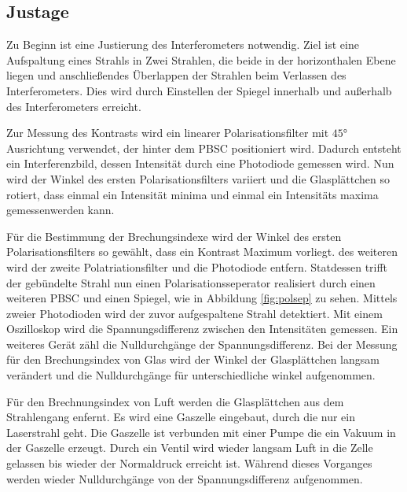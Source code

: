 \subsection{Justage}
Zu Beginn ist eine Justierung des Interferometers notwendig.
Ziel ist eine Aufspaltung eines Strahls in Zwei Strahlen, die beide in
der horizonthalen Ebene liegen und anschließendes Überlappen der Strahlen
beim Verlassen des Interferometers. Dies wird durch Einstellen der
Spiegel innerhalb und außerhalb des Interferometers erreicht.


Zur Messung des Kontrasts wird ein linearer Polarisationsfilter mit $45\si{\degree}$
Ausrichtung verwendet, der hinter dem PBSC positioniert wird.
Dadurch entsteht ein Interferenzbild, dessen Intensität durch eine Photodiode gemessen wird.
Nun wird der Winkel des ersten Polarisationsfilters variiert
und die Glasplättchen so rotiert, dass einmal ein Intensität minima und einmal
ein Intensitäts maxima gemessenwerden kann.

Für die Bestimmung der Brechungsindexe wird der
Winkel des ersten Polarisationsfilters so gewählt, dass ein Kontrast Maximum vorliegt.
des weiteren wird der zweite Polatriationsfilter und die Photodiode entfern.
Statdessen trifft der gebündelte Strahl nun einen Polarisationsseperator realisiert durch einen
weiteren PBSC und einen Spiegel, wie in Abbildung \ref{fig:polsep} zu sehen.
Mittels zweier Photodioden wird der zuvor aufgespaltene Strahl detektiert.
Mit einem Oszilloskop wird die Spannungsdifferenz zwischen den Intensitäten
gemessen. Ein weiteres Gerät zähl die Nulldurchgänge der Spannungsdifferenz.
Bei der Messung für den Brechungsindex von Glas wird
der Winkel der Glasplättchen langsam verändert und die Nulldurchgänge für unterschiedliche
winkel aufgenommen.

Für den Brechnungsindex von Luft werden die Glasplättchen
aus dem Strahlengang enfernt. Es wird eine Gaszelle eingebaut, durch
die nur ein Laserstrahl geht. Die Gaszelle ist verbunden mit einer Pumpe
die ein Vakuum in der Gaszelle erzeugt. Durch ein Ventil wird wieder langsam
Luft in die Zelle gelassen bis wieder der Normaldruck erreicht ist. Während
dieses Vorganges werden wieder Nulldurchgänge von der Spannungsdifferenz aufgenommen.
